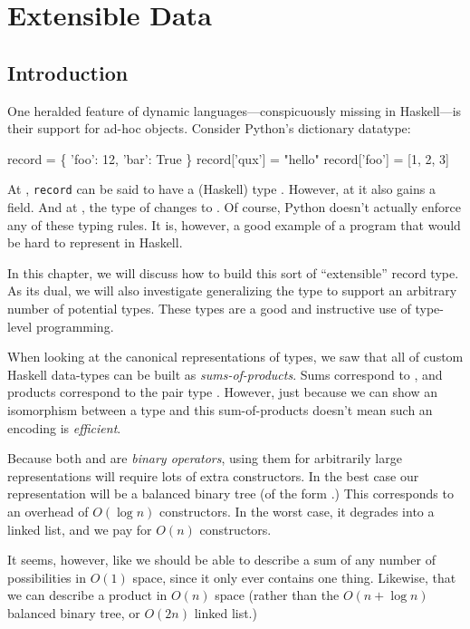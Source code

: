 \documentclass[book.tex]{subfiles}
\begin{document}
\chapter{Extensible Data}

\section{Introduction}

One heralded feature of dynamic languages---conspicuously missing in
Haskell---is their support for ad-hoc objects. Consider Python's dictionary
datatype:

\begin{code}
record = \{ 'foo': 12, 'bar': True \} 
record['qux'] = "hello" 
record['foo'] = [1, 2, 3] 
\end{code}

At , \texttt{record} can be said to have a (Haskell) type
. However, at  it also gains a
 field. And at , the type of  changes to
\hs{[Int]}. Of course, Python doesn't actually enforce any of these typing
rules. It is, however, a good example of a program that would be hard to
represent in Haskell.

In this chapter, we will discuss how to build this sort of ``extensible'' record
type. As its dual, we will also investigate generalizing the  type to
support an arbitrary number of potential types. These types are a good and
instructive use of type-level programming.

When looking at the canonical representations of types, we saw that all of
custom Haskell data-types can be built as \emph{sums-of-products}. Sums
correspond to , and products correspond to the pair type . However, just because we can show an \gls{isomorphism} between a type and this
sum-of-products doesn't mean such an encoding is \emph{efficient}.

Because both  and \ty{(,)} are \emph{binary operators},
using them for arbitrarily large representations will require lots of extra
constructors. In the best case our representation will be a balanced binary tree
(of the form .) This corresponds to an
overhead of $O(\log{n})$ constructors. In the worst case, it degrades into a
linked list, and we pay for $O(n)$ constructors.

It seems, however, like we should be able to describe a sum of any number of
possibilities in $O(1)$ space, since it only ever contains one thing. Likewise,
that we can describe a product in $O(n)$ space (rather than the $O(n+\log{n})$
balanced binary tree, or $O(2n)$ linked list.)
\end{document}
